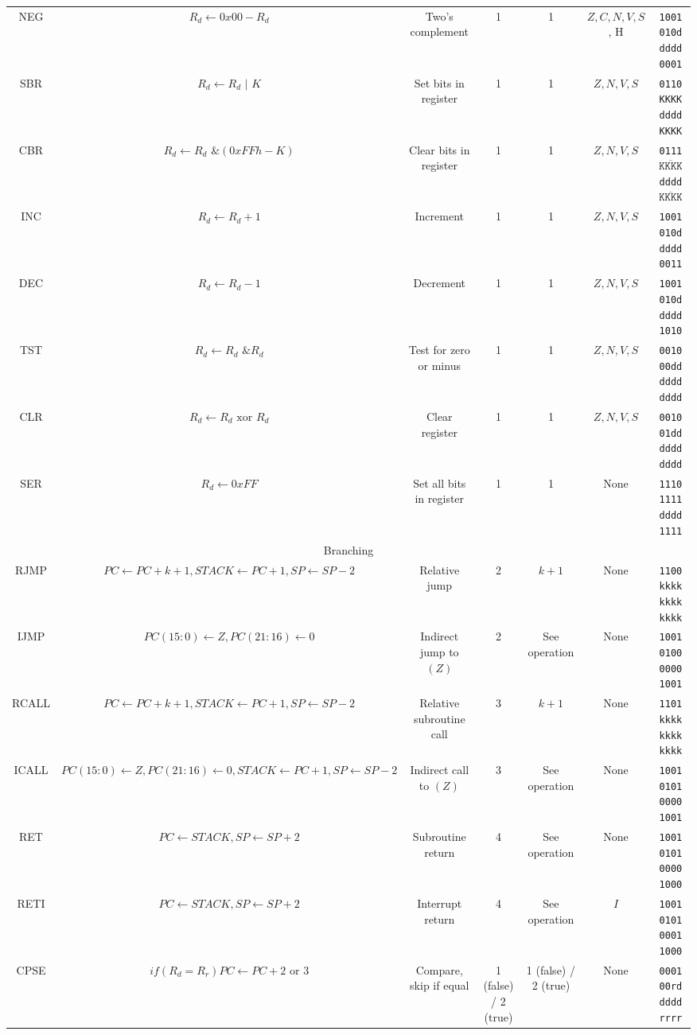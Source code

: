 \documentclass[11pt]{article}
\begin{document}
\begin{center}
\begin{longtable}{|c|c|c|c|c|c|c|}
NEG & $R_d \leftarrow 0x00 - R_d$ & Two's complement & 1 & 1 & $Z, C, N, V, S$, H & \texttt{1001 010d dddd 0001}\\
SBR & $R_d \leftarrow R_d \text{ | } K$ & Set bits in register & 1 & 1 & $Z, N, V, S$ & \texttt{0110 KKKK dddd KKKK}\\
CBR & $R_d \leftarrow R_d \text{ \& } (0xFFh - K)$ & Clear bits in register & 1 & 1 & $Z, N, V, S$ & \texttt{0111 }$\overline{\texttt{KKKK}}$\texttt{ dddd }$\mathtt{\overline{KKKK}}$\\ %
INC & $R_d \leftarrow R_d + 1$ & Increment & 1 & 1 & $Z, N, V, S$ & \texttt{1001 010d dddd 0011}\\
DEC & $R_d \leftarrow R_d - 1$ & Decrement & 1 & 1 & $Z, N, V, S$ & \texttt{1001 010d dddd 1010}\\
TST & $R_d \leftarrow R_d \text{ \& } R_d$ & Test for zero or minus & 1 & 1 & $Z, N, V, S$ & \texttt{0010 00dd dddd dddd}\\
CLR & $R_d \leftarrow R_d \text{ xor } R_d$ & Clear register & 1 & 1 & $Z, N, V, S$ & \texttt{0010 01dd dddd dddd}\\
SER & $R_d \leftarrow 0xFF$ & Set all bits in register & 1 & 1 & None & \texttt{1110 1111 dddd 1111}\\
\hline\hline
\multicolumn{7}{|c|}{Branching} \\
\hline
RJMP & $PC \leftarrow PC + k + 1, STACK \leftarrow PC + 1, SP \leftarrow SP - 2$ & Relative jump & 2 & $k + 1$ & None & \texttt{1100 kkkk kkkk kkkk}\\
IJMP & $PC(15:0) \leftarrow Z, PC(21:16) \leftarrow 0$ & Indirect jump to $(Z)$ & 2 & See operation & None & \texttt{1001 0100 0000 1001}\\
RCALL & $PC \leftarrow PC + k + 1, STACK \leftarrow PC + 1, SP \leftarrow SP - 2$ & Relative subroutine call & 3 & $k + 1$ & None & \texttt{1101 kkkk kkkk kkkk}\\
ICALL & $PC(15:0) \leftarrow Z, PC(21:16) \leftarrow 0, STACK \leftarrow PC + 1, SP \leftarrow SP - 2$ & Indirect call to $(Z)$ & 3 & See operation & None & \texttt{1001 0101 0000 1001}\\
RET & $PC \leftarrow STACK, SP \leftarrow SP + 2$ & Subroutine return & 4 & See operation & None & \texttt{1001 0101 0000 1000}\\
RETI & $PC \leftarrow STACK, SP \leftarrow SP + 2$ & Interrupt return & 4 & See operation & $I$ & \texttt{1001 0101 0001 1000}\\
CPSE & $if(R_d = R_r) PC \leftarrow PC + 2 \text{ or } 3$ & Compare, skip if equal & 1 (false) / 2 (true) & 1 (false) / 2 (true) & None & \texttt{0001 00rd dddd rrrr}\\

\end{longtable}
\end{center}
\end{document}
